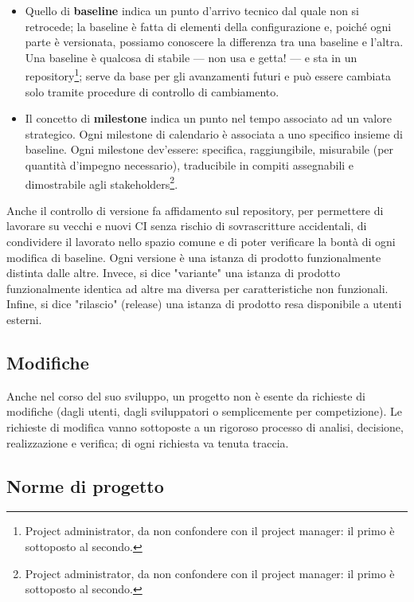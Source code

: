 \documentclass[a4paper]{article}
\begin{document}
	\begin{itemize}
		
			
	\item Quello di \textbf{baseline} indica un punto d'arrivo tecnico dal quale non si retrocede; la baseline è fatta di elementi della configurazione e, poiché ogni parte è versionata, possiamo conoscere la differenza tra una baseline e l'altra. Una baseline è qualcosa di stabile --- non usa e getta! --- e sta in un repository\footnote{Project administrator, da non confondere con il project manager: il primo è sottoposto al secondo.}; serve da base per gli avanzamenti futuri e può essere cambiata solo tramite procedure di controllo di cambiamento.
			
	\item Il concetto di \textbf{milestone} indica un punto nel tempo associato ad un valore strategico. Ogni milestone di calendario è associata a uno specifico insieme di baseline. Ogni milestone dev'essere: specifica, raggiungibile, misurabile (per quantità d'impegno necessario), traducibile in compiti assegnabili e dimostrabile agli stakeholders\footnote{Project administrator, da non confondere con il project manager: il primo è sottoposto al secondo.}.
		
	\end{itemize}

		
Anche il controllo di versione fa affidamento sul repository, per permettere di lavorare su vecchi e nuovi CI senza rischio di sovrascritture accidentali, di condividere il lavorato nello spazio comune e di poter verificare la bontà di ogni modifica di baseline. Ogni versione è una istanza di prodotto funzionalmente distinta dalle altre. Invece, si dice "variante" una istanza di prodotto funzionalmente identica ad altre ma diversa per caratteristiche non funzionali. Infine, si dice "rilascio" (release) una istanza di prodotto resa disponibile a utenti esterni.

		
	\subsection{Modifiche}

		
Anche nel corso del suo sviluppo, un progetto non è esente da richieste di modifiche (dagli utenti, dagli sviluppatori o semplicemente per competizione). Le richieste di modifica vanno sottoposte a un rigoroso processo di analisi, decisione, realizzazione e verifica; di ogni richiesta va tenuta traccia.

		
	\subsection{Norme di progetto}
\end{document}
